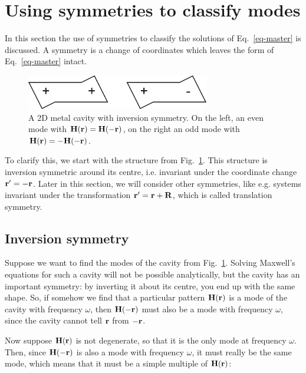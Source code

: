 \section{Using symmetries to classify modes}

In this section the use of symmetries to classify the solutions of Eq.~\ref{eq-master} is discussed.  A symmetry is a change of coordinates which leaves the form of Eq.~\ref{eq-master} intact.  

\begin{figure}
\centering
\includegraphics[width=8cm]{periodic/figures/symmcav}
\caption{A 2D metal cavity with inversion symmetry. On the left, an even mode with ${\bf H}({\bf r}) = {\bf H}(-{\bf r})$, on the right an odd mode with ${\bf H}({\bf r})=-{\bf H}(-{\bf r})$.}
\label{fig-symmcav}
\end{figure}

To clarify this, we start with the structure from Fig.~\ref{fig-symmcav}. This structure is inversion symmetric around its centre, i.e. invariant under the coordinate change ${\bf r}' = -{\bf r}$. Later in this section, we will consider other symmetries, like e.g. systems invariant under the transformation ${\bf r}' = {\bf r} + {\bf R}$, which is called translation symmetry.

\subsection{Inversion symmetry}

Suppose we want to find the modes of the cavity from Fig.~\ref{fig-symmcav}. Solving Maxwell's equations for such a cavity will not be possible analytically, but the cavity has an important symmetry: by inverting it about its centre, you end up with the same shape. So, if somehow we find that a particular pattern ${\bf H({\bf r})}$ is a mode of the cavity with frequency $\omega$, then ${\bf H({\bf -r})}$ must also be a mode with frequency $\omega$, since the cavity cannot tell ${\bf r}$ from ${\bf -r}$.

Now suppose ${\bf H({\bf r})}$ is not degenerate, so that it is the only mode at frequency $\omega$. Then, since ${\bf H({\bf -r})}$ is also a mode with frequency $\omega$, it must really be the same mode, which means that it must be a simple multiple of ${\bf H({\bf r})}$:

